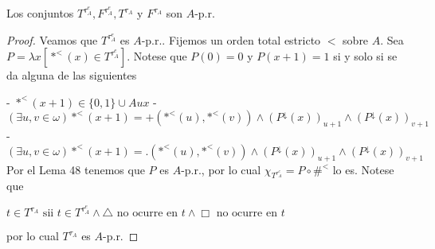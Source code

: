   \begin{lemma}
    Los conjuntos \(T^{\tau _{A}^{e}},F^{\tau _{A}^{e}},T^{\tau _{A}}\) y \(F^{\tau _{A}}\) son \(A\)-p.r.
  \end{lemma}
  \begin{proof}
    Veamos que \(T^{\tau _{A}^{e}}\) es \(A\)-p.r.. Fijemos un orden total estricto \( < \) sobre \(A\). Sea \(P=\lambda x[\ast ^{< }(x)\in T^{\tau _{A}^{e}}]\). Notese que \(P(0)=0\) y \(P(x+1)=1\) si y solo si se da alguna de las siguientes

    - \(\ast ^{< }(x+1)\in \{0,1\}\cup Aux\)
    - \((\exists u,v\in \omega )\ast ^{< }(x+1)=+(\mathrm{\ast }^{< }(u), \mathrm{\ast }^{< }(v))\wedge (P^{\downarrow }(x))_{u+1}\wedge (P^{\downarrow }(x))_{v+1}\)
    - \((\exists u,v\in \omega )\ast ^{< }(x+1)=\mathrm{.}(\mathrm{\ast } ^{< }(u),\mathrm{\ast }^{< }(v))\wedge (P^{\downarrow }(x))_{u+1}\wedge (P^{\downarrow }(x))_{v+1}\)
    Por el Lema 48 tenemos que \(P\) es \(A\)-p.r., por lo cual \(\chi _{T^{\tau _{A}^{e}}}=P\circ \#^{< }\) lo es. Notese que

    \(\displaystyle t\in T^{\tau _{A}}\text{ sii }t\in T^{\tau _{A}^{e}}\wedge \triangle \text{ no ocurre en }t\wedge \Box \text{ no ocurre en }t \)

    por lo cual \(T^{\tau _{A}}\) es \(A\)-p.r.
  \end{proof}

